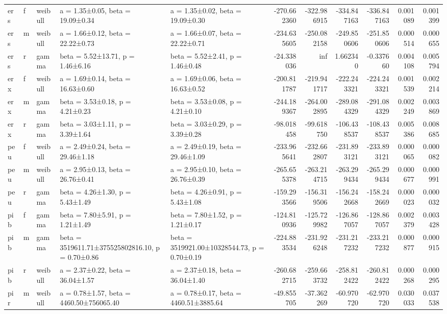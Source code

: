 \begin{tabular}{lllllrrrrrr}
ers & f & weibull & a = 1.35±0.05, beta = 19.09±0.34 & a = 1.35±0.02, beta = 19.09±0.30 & -270.662360 & -322.986915 & -334.847163 & -336.847163 & 0.001089 & 0.001399 \\
ers & m & weibull & a = 1.66±0.12, beta = 22.22±0.73 & a = 1.66±0.07, beta = 22.22±0.71 & -234.635605 & -250.082158 & -249.850606 & -251.850606 & 0.000514 & 0.000655 \\
ers & r & gamma & beta = 5.52±13.71, p = 1.46±6.16 & beta = 5.52±2.41, p = 1.46±0.48 & -24.338036 & inf & 1.662340 & -0.337660 & 0.004108 & 0.005794 \\
erx & f & weibull & a = 1.69±0.14, beta = 16.63±0.60 & a = 1.69±0.06, beta = 16.63±0.52 & -200.811787 & -219.941717 & -222.243321 & -224.243321 & 0.001539 & 0.002214 \\
erx & m & gamma & beta = 3.53±0.18, p = 4.21±0.23 & beta = 3.53±0.08, p = 4.21±0.10 & -244.189367 & -264.002895 & -289.084329 & -291.084329 & 0.002249 & 0.003869 \\
erx & r & gamma & beta = 3.03±1.11, p = 3.39±1.64 & beta = 3.03±0.29, p = 3.39±0.28 & -98.018458 & -99.618750 & -106.438537 & -108.438537 & 0.005386 & 0.008685 \\
peu & f & weibull & a = 2.49±0.24, beta = 29.46±1.18 & a = 2.49±0.19, beta = 29.46±1.09 & -233.965641 & -232.662807 & -231.893121 & -233.893121 & 0.000065 & 0.000082 \\
peu & m & weibull & a = 2.95±0.13, beta = 26.76±0.41 & a = 2.95±0.10, beta = 26.76±0.39 & -265.655378 & -263.214715 & -263.299434 & -265.299434 & 0.000677 & 0.000991 \\
peu & r & gamma & beta = 4.26±1.30, p = 5.43±1.49 & beta = 4.26±0.91, p = 5.43±1.08 & -159.293566 & -156.319506 & -156.242668 & -158.242669 & 0.000023 & 0.000032 \\
pib & f & gamma & beta = 7.80±5.91, p = 1.21±1.49 & beta = 7.80±1.52, p = 1.21±0.17 & -124.810936 & -125.729982 & -126.867057 & -128.867057 & 0.002379 & 0.003428 \\
pib & m & gamma & beta = 3519611.71±375525802816.10, p = 0.70±0.86 & beta = 3519921.00±10328544.73, p = 0.70±0.19 & -224.883534 & -231.926248 & -231.217232 & -233.217232 & 0.000877 & 0.000915 \\
pib & r & weibull & a = 2.37±0.22, beta = 36.04±1.57 & a = 2.37±0.18, beta = 36.04±1.40 & -260.682715 & -259.663732 & -258.812422 & -260.812422 & 0.000268 & 0.000295 \\
pir & m & weibull & a = 0.78±1.57, beta = 4460.50±756065.40 & a = 0.78±0.17, beta = 4460.51±3885.64 & -49.855705 & -37.362269 & -60.970720 & -62.970720 & 0.030033 & 0.037538 \\

\end{tabular}
